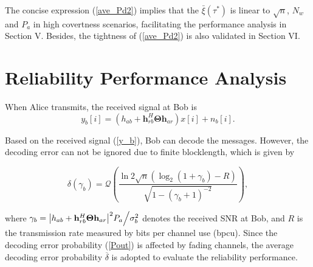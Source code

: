 \documentclass[conference]{IEEEtran}
\begin{document}
The concise expression (\ref{ave_Pd2}) implies that the $\bar \xi(\tau^*)$ is linear to $\sqrt{n}$, $N_w$ and $P_a$ in high covertness scenarios, facilitating the performance analysis in Section V. Besides, the tightness of (\ref{ave_Pd2}) is also validated in Section VI.

\section{Reliability Performance Analysis}
When Alice transmits, the received signal at Bob is
\begin{equation}\label{y_b}
	{y_b}[i] = \left( {{h_{ab}} + {\mathbf{h}}_{rb}^H{\mathbf{\Theta }}{{\mathbf{h}}_{ar}}} \right)x[i] + {n_b}[i].
\end{equation}

Based on the received signal (\ref{y_b}), Bob can decode the messages. However, the decoding error can not be ignored due to finite blocklength, which is given by \cite{Q_app}
\begin{small}
\begin{equation}\label{Pout}
	\delta \left( {{\gamma _b}} \right) = \mathcal{Q}\left( {\frac{{\ln 2\sqrt n \left( {{{\log }_2}\left( {1 + {\gamma _b}} \right) - R} \right)}}{{\sqrt {1 - {{\left( {{\gamma _b} + 1} \right)}^{ - 2}}} }}} \right),
\end{equation}
\end{small}
where ${\gamma _b} = {{{{\left| {{h_{ab}} + {\mathbf{h}}_{rb}^H{\mathbf{\Theta }}{{\mathbf{h}}_{ar}}} \right|}^2}{P_a}} \mathord{\left/
		{\vphantom {{{{\left| {{h_{ab}} + {\mathbf{h}}_{rb}^H{\mathbf{\Theta }}{{\mathbf{h}}_{ar}}} \right|}^2}{P_a}} {\sigma _b^2}}} \right.
		\kern-\nulldelimiterspace} {\sigma _b^2}}$ denotes the received SNR at Bob, and $R$ is the transmission rate measured by bits per channel use (bpcu). Since the decoding error probability (\ref{Pout}) is affected by fading channels, the average decoding error probability $\overline \delta$ is adopted to evaluate the reliability performance.
\end{document}

